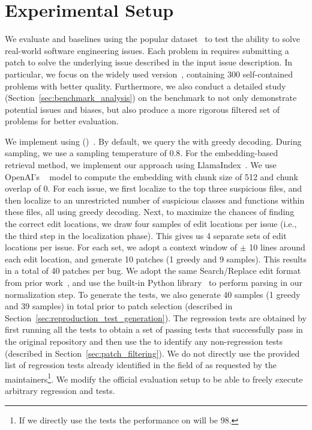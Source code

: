 \section{Experimental Setup}

We evaluate \tech and baselines using the popular \swebench{} dataset~\cite{swebench} to test the ability to solve real-world software engineering issues. 
Each problem in \swebench requires submitting a patch to solve the underlying issue described in the input issue description. 
In particular, we focus on the widely used  \swebenchlite{} version~\cite{swebenchlite}, containing 300 self-contained problems with better quality.
Furthermore, we also conduct a detailed study (Section~\ref{sec:benchmark_analysis}) on the \swebenchlite{} benchmark to not only demonstrate potential issues and biases, but also produce a more rigorous filtered set of problems for better evaluation. %

We implement \tech using \gptfouro{} ()~\cite{gpt4o}.
By default, we query the \llm with greedy decoding. 
During sampling, we use a sampling temperature of $0.8$.
For the embedding-based retrieval method, we implement our approach using LlamaIndex~\cite{llamaindex}. 
We use OpenAI's ~\cite{openaiembedding} model to compute the embedding with chunk size of 512 and chunk overlap of 0.
For each issue, we first localize to the top three suspicious files, and then localize to an unrestricted number of suspicious classes and functions within these files, all using greedy decoding.
Next, to maximize the chances of finding the correct edit locations, we draw four samples of edit locations per issue (i.e., the third step in the localization phase).
This gives us 4 separate sets of edit locations per issue.
For each set, we adopt a context window of $\pm$ 10 lines around each edit location, and generate 10 patches (1 greedy and 9 samples).
This results in a total of 40 patches per bug.
We adopt the same Search/Replace edit format from prior work~\cite{aidar}, and use the built-in Python  library~\cite{ast} to perform parsing in our normalization step.
To generate the \reproduction tests, we also generate 40 samples (1 greedy and 39 samples) in total prior to patch selection (described in Section~\ref{sec:reproduction_test_generation}).
%
The regression tests are obtained by first running all the tests to obtain a set of passing tests that successfully pass in the original repository and then use the \llm to identify any non-regression tests (described in Section~\ref{sec:patch_filtering}). 
We do not directly use the provided list of regression tests already identified in the  field of \swebench as requested by the \swebench maintainers\footnote{If we directly use the  tests the performance on \swebenchlite{} will be 98.}. 
We modify the official \swebench evaluation setup to be able to freely execute arbitrary regression and \reproduction tests.


